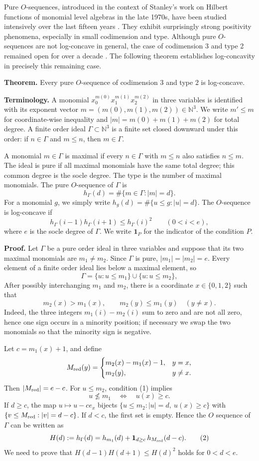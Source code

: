 Pure $O$-sequences, introduced in the context of Stanley’s work on Hilbert functions of monomial level algebras in the late 1970s, have been studied intensively over the last fifteen years \cite{Stanley1978}. They exhibit surprisingly strong positivity phenomena, especially in small codimension and type. Although pure $O$-sequences are not log-concave in general, the case of codimension 3 and type 2 remained open for over a decade \cite{BMMNZ2012,Zanello2024}. The following theorem establishes log-concavity in precisely this remaining case. 

\noindent \textbf{Theorem.}
Every pure $O$-sequence of codimension $3$ and type $2$ is
log-concave.


\noindent\textbf{Terminology.}
A monomial $x_0^{m(0)}x_1^{m(1)}x_2^{m(2)}$ in three variables is
identified with its exponent vector $m=(m(0),m(1),m(2))\in\mathbb N^3$. 
We write $m'\le m$ for coordinate-wise inequality and
$|m|=m(0)+m(1)+m(2)$ for total degree.  A finite order ideal
$\Gamma\subset\mathbb N^3$ is a finite set closed downward under this
order: if $n\in\Gamma$ and $m\le n$, then $m\in\Gamma$.

A monomial $m\in\Gamma$ is maximal if every $n\in\Gamma$ with
$m\le n$ also satisfies $n\le m$.  The ideal is pure if all maximal
monomials have the same total degree; this common degree is the socle
degree.  The type is the number of maximal monomials.  The pure
$O$-sequence of $\Gamma$ is
\[
  h_\Gamma(d)=\#\{m\in\Gamma:|m|=d\}.
\]
For a monomial $g$, we simply write $h_g(d)=\#\{u\le g:|u|=d\}$. The $O$-sequence is log-concave if
\[
  h_\Gamma(i-1)h_\Gamma(i+1)\le h_\Gamma(i)^2
  \qquad(0<i<e),
\]
where $e$ is the socle degree of $\Gamma$.  We write
$\mathbf 1_P$ for the indicator of the condition $P$.

\noindent \textbf{Proof.}
Let $\Gamma$ be a pure order ideal in three variables and suppose that
its two maximal monomials are $m_1\ne m_2$.  Since $\Gamma$ is pure, $|m_1|=|m_2|=e$.
Every element of a finite order ideal lies below a maximal element, so
\[
  \Gamma=\{u:u\le m_1\} \cup \{u:u\le m_2\},
\]
After possibly interchanging $m_1$ and $m_2$, there is a coordinate
$x\in\{0,1,2\}$ such that
\[
  m_2(x)>m_1(x),
  \qquad
  m_2(y)\le m_1(y)\quad(y\ne x).                         \tag{1}
\]
Indeed, the three integers $m_1(i)-m_2(i)$ sum to zero and are not all
zero, hence one sign occurs in a minority position; if necessary we swap
the two monomials so that the minority sign is negative.

Let $c=m_1(x)+1$, and define
\[
  M_{\rm red}(y)=
  \begin{cases}
    m_2(x)-m_1(x)-1,&y=x,\\
    m_2(y),&y\ne x.
  \end{cases}
\]
Then $|M_{\rm red}|=e-c$. For $u\le m_2$, condition (1) implies
\[
  u\not\le m_1
  \quad\Longleftrightarrow\quad
  u(x)\ge c.
\]
If $d\ge c$, the map $u\mapsto u-ce_x$ bijects
$\{u\le m_2:|u|=d,\ u(x)\ge c\}$
with
$\{v\le M_{\rm red}:|v|=d-c\}$.
If $d<c$, the first set is empty.  Hence the $O$ sequence of
$\Gamma$ can be written as 
\[
  H(d):=h_\Gamma(d)
  =
  h_{m_1}(d)+\mathbf 1_{d\ge c}\,h_{M_{\rm red}}(d-c).       \tag{2}
\]
We need to prove that $H(d-1)H(d+1)\le H(d)^2$ holds for $0<d<e$.

